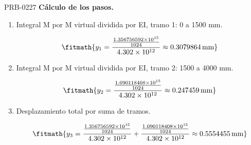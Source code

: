 \begin{studiumworked}{PRB-0227}
\textbf{Cálculo de los pasos.}

\begin{enumerate}

\item Integral M por M virtual dividida por EI, tramo 1: 0 a 1500 mm.

\[\fitmath{y_{1}=\frac{\frac{1.356756592\times10^{15}}{1024}}{4.302\times10^{12}}\approx 0.3079864\,\mathrm{mm}}\]

\item Integral M por M virtual dividida por EI, tramo 2: 1500 a 4000 mm.

\[\fitmath{y_{2}=\frac{\frac{1.090118408\times10^{15}}{1024}}{4.302\times10^{12}}\approx 0.247459\,\mathrm{mm}}\]

\item Desplazamiento total por suma de tramos.

\[\fitmath{y_{3}=\frac{\frac{1.356756592\times10^{15}}{1024}}{4.302\times10^{12}}+\frac{\frac{1.090118408\times10^{15}}{1024}}{4.302\times10^{12}}\approx 0.5554455\,\mathrm{mm}}\]

\end{enumerate}


\end{studiumworked}
